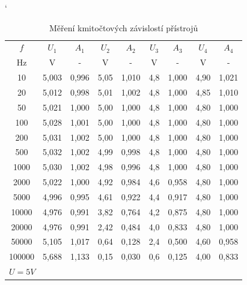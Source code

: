 \documentclass[a4paper, czech]{article}
\begin{document}
\begin{table}[H]
    \catcode`
    \centering
    \caption{Měření kmitočtových závislostí přístrojů}
    \begin{tabular}{ccccccccc}
        \toprule
        $f$      & $U_1$    & $A_1$    & $U_2$   & $A_2$    & $U_3$  & $A_3$    & $U_4$   & $A_4$    \\
        \cmidrule(rl){1-1}
        \cmidrule(rl){2-3}
        \cmidrule(rl){4-5}
        \cmidrule(rl){6-7}
        \cmidrule(rl){8-9}
        Hz     & V     & -     & V    & -     & V   & -     & V    & -     \\
        \midrule
        10     & 5,003 & 0,996 & 5,05 & 1,010 & 4,8 & 1,000 & 4,90 & 1,021 \\
        20     & 5,012 & 0,998 & 5,01 & 1,002 & 4,8 & 1,000 & 4,85 & 1,010 \\
        50     & 5,021 & 1,000 & 5,00 & 1,000 & 4,8 & 1,000 & 4,80 & 1,000 \\
        100    & 5,028 & 1,001 & 5,00 & 1,000 & 4,8 & 1,000 & 4,80 & 1,000 \\
        200    & 5,031 & 1,002 & 5,00 & 1,000 & 4,8 & 1,000 & 4,80 & 1,000 \\
        500    & 5,032 & 1,002 & 4,99 & 0,998 & 4,8 & 1,000 & 4,80 & 1,000 \\
        1000   & 5,030 & 1,002 & 4,98 & 0,996 & 4,8 & 1,000 & 4,80 & 1,000 \\
        2000   & 5,022 & 1,000 & 4,92 & 0,984 & 4,6 & 0,958 & 4,80 & 1,000 \\
        5000   & 4,996 & 0,995 & 4,61 & 0,922 & 4,4 & 0,917 & 4,80 & 1,000 \\
        10000  & 4,976 & 0,991 & 3,82 & 0,764 & 4,2 & 0,875 & 4,80 & 1,000 \\
        20000  & 4,976 & 0,991 & 2,42 & 0,484 & 4,0 & 0,833 & 4,80 & 1,000 \\
        50000  & 5,105 & 1,017 & 0,64 & 0,128 & 2,4 & 0,500 & 4,60 & 0,958 \\
        100000 & 5,688 & 1,133 & 0,15 & 0,030 & 0,6 & 0,125 & 4,00 & 0,833 \\
        \bottomrule
        \multicolumn{9}{l}{$U = 5V$}
    \end{tabular}
\end{table}
\end{document}
